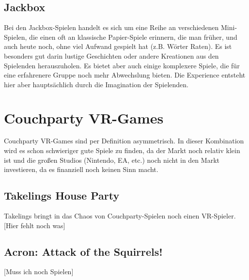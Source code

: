 \subsection{Jackbox}
Bei den Jackbox-Spielen handelt es sich um eine Reihe an verschiedenen Mini-Spielen, die einen oft an klassische Papier-Spiele erinnern, die man früher, und auch heute noch, ohne viel Aufwand gespielt hat (z.B. Wörter Raten). Es ist besonders gut darin lustige Geschichten oder andere Kreationen aus den Spielenden herauszuholen. Es bietet aber auch einige komplexere Spiele, die für eine erfahrenere Gruppe noch mehr Abwechslung bieten. Die Experience entsteht hier aber hauptsächlich durch die Imagination der Spielenden.

\section{Couchparty VR-Games}

Couchparty VR-Games sind per Definition asymmetrisch. In dieser Kombination wird es schon schwieriger gute Spiele zu finden, da der Markt noch relativ klein ist und  die großen Studios (Nintendo, EA, etc.) noch nicht in den Markt investieren, da es finanziell noch keinen Sinn macht.

\subsection{Takelings House Party}

Takelings bringt in das Chaos von Couchparty-Spielen noch einen VR-Spieler. [Hier fehlt noch was]

\subsection{Acron: Attack of the Squirrels!}
[Muss ich noch Spielen]